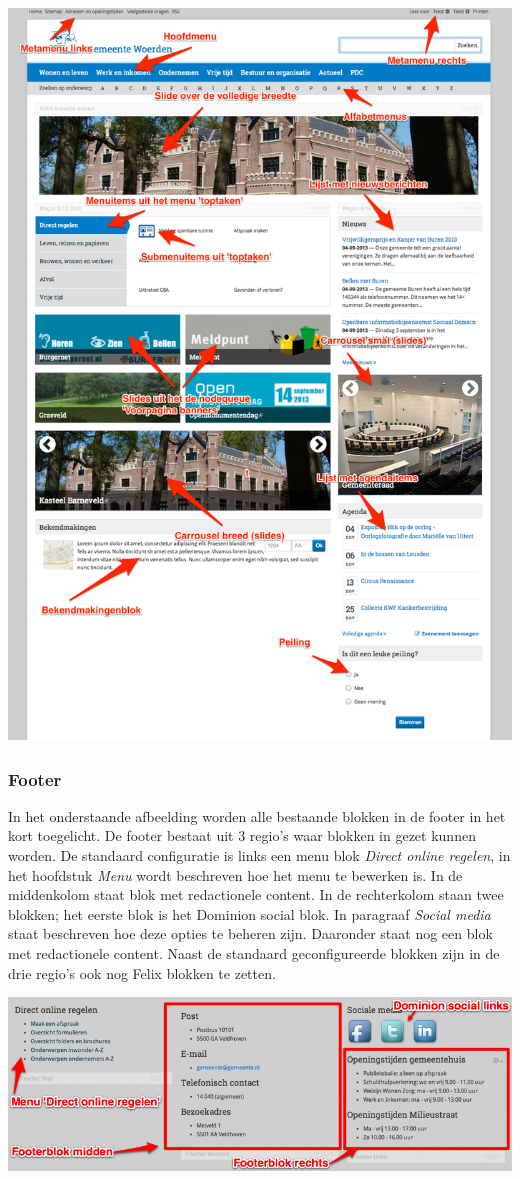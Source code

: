 \begin{center}
	\includegraphics[width=\textwidth]{img/voorpagina.png}
\end{center}

\subsubsection{Footer}

In het onderstaande afbeelding worden alle bestaande blokken in de footer in het kort toegelicht. De footer bestaat uit 3 regio's waar blokken in gezet kunnen worden. De standaard configuratie is links een menu blok \emph{Direct online regelen}, in het hoofdstuk \emph{Menu} wordt beschreven hoe het menu te bewerken is. In de middenkolom staat blok met redactionele content. In de rechterkolom staan twee blokken; het eerste blok is het Dominion social blok. In paragraaf \emph{Social media} staat beschreven hoe deze opties te beheren zijn. Daaronder staat nog een blok met redactionele content. Naast de standaard geconfigureerde blokken zijn in de drie regio's ook nog Felix blokken te zetten. 

\bigskip

\begin{center}
	\includegraphics[width=\textwidth]{img/voorpagina3.png}
\end{center}